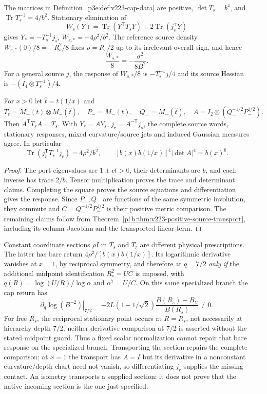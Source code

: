 \documentclass[12pt,a4paper]{article}
\begin{document}
\begin{theorem}
\label{p3e:thm:v223-cap-source}
The matrices in Definition~\ref{p3e:def:v223-cap-data} are positive,
$\det T_s=b^4$, and $\operatorname{Tr}T_s^{-1}=4/b^2$.
Stationary elimination of
\[
 W_s(Y)=\operatorname{Tr}(Y^{\mathsf T}T_sY)
                       +2\operatorname{Tr}(j_s^{\mathsf T}Y)
\]
gives $Y_*=-T_s^{-1}j_s$, $W_{s,*}=-4\rho^2/b^2$.
The reference source density $W_{s,*}(0)/8=-R_s^2/8$ fixes
$\rho=R_s/2$ up to its irrelevant overall sign, and hence
\[
 \frac{W_{s,*}}8=-\frac{\sigma^2}{8B^2}.
\]
For a general source $j$, the response of $W_{s,*}/8$ is
$-T_s^{-1}j/4$ and its source Hessian is $-(I_4\otimes T_s^{-1})/4$.

For $x>0$ let $\widehat t=t(1/x)$ and
\[
 T_r=M_+(t)\otimes M_-(\widehat t),\quad
 P_-=M_-(t),\quad Q_-=M_-(\widehat t),\quad
 A=I_2\otimes(Q_-^{-1/2}P_-^{1/2}).
\]
Then $A^{\mathsf T}T_rA=T_s$.  With
$Y_r=AY_s$, $j_r=A^{-\mathsf T}j_s$, the complete source words,
stationary responses, mixed curvature/source jets and induced Gaussian
measures agree.  In particular
\[
 \operatorname{Tr}(j_r^{\mathsf T}T_r^{-1}j_r)=4\rho^2/b^2,
 \qquad [b(x)b(1/x)]^4|\det A|^4=b(x)^8.
\]
\end{theorem}
\begin{proof}
The port eigenvalues are $1\pm ct>0$, their determinants are $b$,
and each inverse has trace $2/b$.  Tensor multiplication proves the
trace and determinant claims.  Completing the square proves the source
equations and differentiation gives the response.  Since $P_-,Q_-$
are functions of the same symmetric involution, they commute and
$C=Q_-^{-1/2}P_-^{1/2}$ is their positive metric comparison.
The remaining claims follow from
Theorem~\ref{p1b:thm:v223-positive-source-transport}, including its
column Jacobian and the transported linear term.
\end{proof}
Constant coordinate sections $\rho I$ in $T_s$ and $T_r$ are different
physical prescriptions.  The latter has bare return
$4\rho^2/[b(x)b(1/x)]$.  Its logarithmic derivative vanishes at
$x=1$, by reciprocal symmetry, and therefore at $q=7/2$ \emph{only
if} the additional midpoint identification $R_s^2=UC$ is imposed,
with $q(R)=\log(U/R)/\log\alpha$ and $\alpha^7=U/C$.
On this same specialized branch the cap return has
\[
 \left.\partial_q\log(B^{-2})\right|_{7/2}
 =-2L(1-1/\sqrt2)\frac{B(R_s)-B_U}{B(R_s)}\ne0.
\]
For free $R_s$, the reciprocal stationary point occurs at $R=R_s$,
not necessarily at hierarchy depth $7/2$; neither derivative comparison
at $7/2$ is asserted without the stated midpoint guard.
Thus a fixed scalar normalization cannot repair that bare response on
the specialized branch.  Transporting the section repairs the complete
comparison: at $x=1$ the transport has $A=I$ but its derivative in a
nonconstant curvature/depth chart need not vanish, so differentiating
$j_r$ supplies the missing contact.  An isometry transports a supplied section; it does
not prove that the native incoming section is the one just specified.
\end{document}
